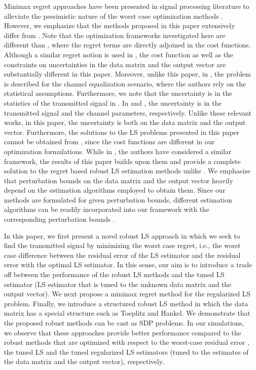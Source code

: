 \documentclass[review,sort&compress]{elsarticle}
\begin{document}
Minimax regret approaches have been presented in signal processing literature to alleviate the pessimistic nature of the worst case optimization methods \cite{ElMe04, ElTaNe04, eldar_mrr, Kozat:09TSP,donmez,kalantarova}. However, we emphasize that the methods proposed in this paper extensively differ from \cite{Ghaoui97, sayed02, ElMe04, ElTaNe04,Kozat:09TSP,donmez}. Note that the optimization frameworks investigated here are different than \cite{Ghaoui97, sayed02}, where the regret terms are directly adjoined in the cost functions. Although a similar regret notion is used in \cite{ElMe04,ElTaNe04,Kozat:09TSP,donmez}, the cost function as well as the constraints on uncertainties in the data matrix and the output vector are substantially different in this paper. Moreover, unlike this paper, in \cite{donmez}, the problem is described for the channel equalization scenario, where the authors rely on the statistical assumptions. Furthermore, we note that the uncertainty is in the statistics of the transmitted signal in \cite{ElMe04}. In \cite{ElTaNe04} and \cite{Kozat:09TSP}, the uncertainty is in the transmitted signal and the channel parameters, respectively. Unlike these relevant works, in this paper, the uncertainty is both on the data matrix and the output vector. Furthermore, the solutions to the LS problems presented in this paper cannot be obtained from \cite{ElMe04, ElTaNe04, Kozat:09TSP,donmez,kalantarova}, since the cost functions are different in our optimization formulations. While in \cite{kalantarova}, the authors have considered a similar framework, the results of this paper builds upon them and provide a complete solution to the regret based robust LS estimation methods unlike \cite{kalantarova}. We emphasize that perturbation bounds on the data matrix and the output vector heavily depend on the estimation algorithms employed to obtain them. Since our methods are formulated for given perturbation bounds, different estimation algorithms can be readily incorporated into our framework with the corresponding perturbation bounds \cite{sayed02}.

In this paper, we first present a novel robust LS approach in which we seek to find the transmitted signal by minimizing the worst case regret, i.e., the worst case difference between the residual error of the LS estimator and the residual error with the optimal LS estimator. In this sense, our aim is to introduce a trade off between the performance of the robust LS methods and the tuned LS estimator (LS estimator that is tuned to the unknown data matrix and the output vector). We next propose a minimax regret method for the regularized LS problem. Finally, we introduce a structured robust LS method in which the data matrix has a special structure such as Toeplitz and Hankel. We demonstrate that the proposed robust methods can be cast as SDP problems. In our simulations, we observe that these approaches provide better performance compared to the robust methods that are optimized with respect to the worst-case residual error \cite{Ghaoui97, sayed02}, the tuned LS and the tuned regularized LS estimators (tuned to the estimates of the data matrix and the output vector), respectively.
\end{document}
